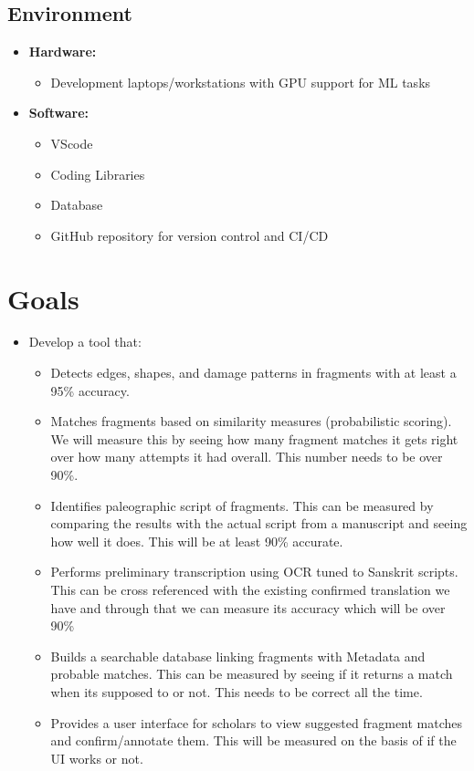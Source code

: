 \documentclass{article}
\begin{document}
\subsection{Environment}
\begin{itemize}
    \item \textbf{Hardware:}
    \begin{itemize} 
        \item Development laptops/workstations with GPU support for ML tasks
    \end{itemize}

    \item \textbf{Software:}
    \begin{itemize} 
        \item VScode
        \item Coding Libraries
        \item Database
        \item GitHub repository for version control and CI/CD
    \end{itemize}
\end{itemize}

\section{Goals}
\begin{itemize}
    \item Develop a tool that:
    \begin{itemize} 
        \item Detects edges, shapes, and damage patterns in fragments with at least a 95\% accuracy.
        \item Matches fragments based on similarity measures (probabilistic scoring). We will measure this by seeing how many fragment matches it gets right over how many attempts it had overall. This number needs to be over 90\%.
        \item Identifies paleographic script of fragments. This can be measured by comparing the results with the actual script from a manuscript and seeing how well it does. This will be at least 90\% accurate.
        \item Performs preliminary transcription using OCR tuned to Sanskrit scripts. This can be cross referenced with the existing confirmed translation we have and through that we can measure its accuracy which will be over 90\%
        \item Builds a searchable database linking fragments with Metadata and probable matches. This can be measured by seeing if it returns a match when its supposed to or not. This needs to be correct all the time.
        \item Provides a user interface for scholars to view suggested fragment matches and confirm/annotate them. This will be measured on the basis of if the UI works or not.
    \end{itemize}
\end{itemize}
\end{document}
